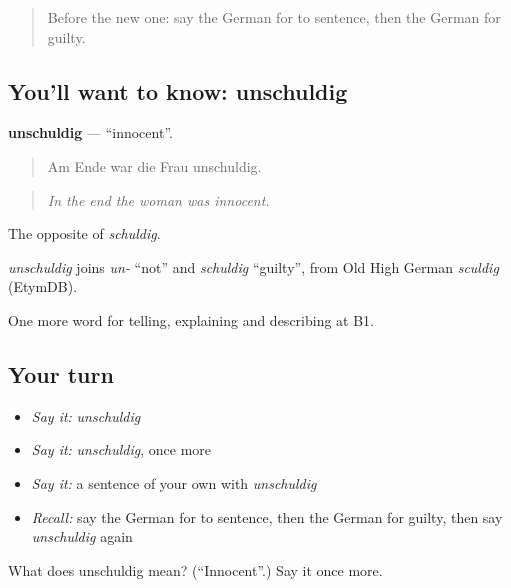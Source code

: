 \label{lesson:GE-C286-unschuldig}



\begin{quote}
Before the new one: say the German for to sentence, then the German for guilty.
\end{quote}

\subsection*{You'll want to know: unschuldig}
\textbf{unschuldig} — \textquotedblleft{}innocent\textquotedblright{}.

\begin{quote}
Am Ende war die Frau unschuldig.
\end{quote}

\begin{quote}
\emph{In the end the woman was innocent.}
\end{quote}

The opposite of \emph{schuldig}.

\begin{cousinweb}
\emph{unschuldig} joins \emph{un-} \textquotedblleft{}not\textquotedblright{} and \emph{schuldig} \textquotedblleft{}guilty\textquotedblright{}, from Old High German \emph{sculdig} (EtymDB).
\end{cousinweb}

\begin{grammarlens}[title={What you've built}]
One more word for telling, explaining and describing at B1.
\end{grammarlens}

\subsection*{Your turn}
\begin{itemize}
\raggedright
  \item \emph{Say it:} \emph{unschuldig}
  \item \emph{Say it:} \emph{unschuldig}, once more
  \item \emph{Say it:} a sentence of your own with \emph{unschuldig}
  \item \emph{Recall:} say the German for to sentence, then the German for guilty, then say \emph{unschuldig} again
\end{itemize}

\begin{tcolorbox}[breakable,colback=teal!4,colframe=teal!35!black,title={Before you move on}]
What does unschuldig mean? (\textquotedblleft{}Innocent\textquotedblright{}.) Say it once more.
\end{tcolorbox}
